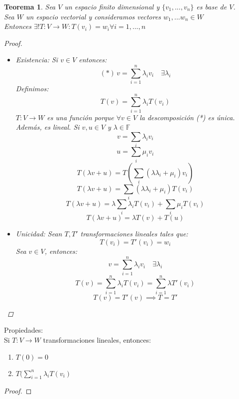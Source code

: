 \documentclass[11pt]{book}
\newtheorem{thm}{Teorema}[section]
\theoremstyle{definition}
\begin{document}
\begin{thm}
	Sea $V$ un espacio finito dimensional y $\{v_1,...,v_n\}$ es base de $V$.\\
	Sea $W$ un espacio vectorial y consideramos vectores $w_1,...w_n\in W$\\
	Entonces $\exists !T:V\rightarrow W: T(v_i)=w_i\forall i=1,...,n$
	\begin{proof}
		\begin{itemize}
			\item Existencia: Si $v\in V$ entonces:
			      \[(*)\, v=\sum^n_{i=1}\lambda_i v_i\quad \exists \lambda_i\]
			      Definimos:
			      \[T(v)=\sum^n_{i=1}\lambda_i T(v_i)\]
			      $T:V\rightarrow W$ es una función porque $\forall v\in V$ la descomposición (*) es única.\\
			      Además, es lineal. Si $v,u\in V$ y $\lambda\in\mathbb{F}$
			      \[v=\sum_i \lambda_i v_i\]
			      \[u=\sum_i\mu_i v_i\]
			      \[T(\lambda v+u)=T(\sum_i(\lambda\lambda_i+\mu_i)v_i)\]
			      \[T(\lambda v+u)=\sum_i(\lambda\lambda_i+\mu_i)T(v_i)\]
			      \[T(\lambda v+u)=\lambda\sum_i\lambda_i T(v_i)+\sum_i\mu_i T(v_i)\]
			      \[T(\lambda v+u)=\lambda T(v)+T(u)\]
			\item Unicidad: Sean $T,T'$ transformaciones lineales tales que:
			      \[T(v_i)=T'(v_i)=w_i\]
			      Sea $v\in V$, entonces:
			      \[v=\sum^n_{i=1}\lambda_i v_i\quad \exists \lambda_i\]
			      \[T(v)=\sum^n_{i=1}\lambda_i T(v_i)=\sum^n_{i=1}\lambda T'(v_i)\]
			      \[T(v)=T'(v)\implies T=T'\]
		\end{itemize}
	\end{proof}
\end{thm}
Propiedades:\\
Si $T:V\rightarrow W$ transformaciones lineales, entonces:
\begin{enumerate}
	\item $T(0)=0$

	\item $T(\sum^n_{i=1}\lambda_iT(v_i)$
\end{enumerate}
\begin{proof}

\end{proof}
\end{document}
